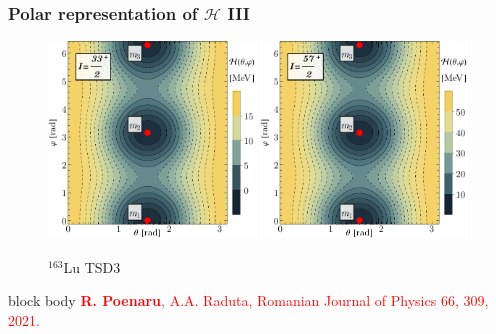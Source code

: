 \documentclass{beamer}
\begin{document}
\begin{frame}
	\frametitle{Polar representation of $\mathcal{H}$ III}
	\vspace{-1cm}
	\begin{figure}
		\centering
		\caption{$^{163}$Lu TSD3}
		\includegraphics[width=0.49\textwidth]{figures/parity-partners-plots/contour-tsd3-1.pdf}
		\includegraphics[width=0.49\textwidth]{figures/parity-partners-plots/contour-tsd3-2.pdf}
	\end{figure}
	\begin{beamercolorbox}[rounded=true,shadow=false, wd=\linewidth,]{block body}
		\centering
		\textcolor{red}{\footnotesize{\textbf{R. Poenaru}, A.A. Raduta, Romanian Journal of Physics 66, 309, 2021.}}
	\end{beamercolorbox}
\end{frame}
\end{document}
